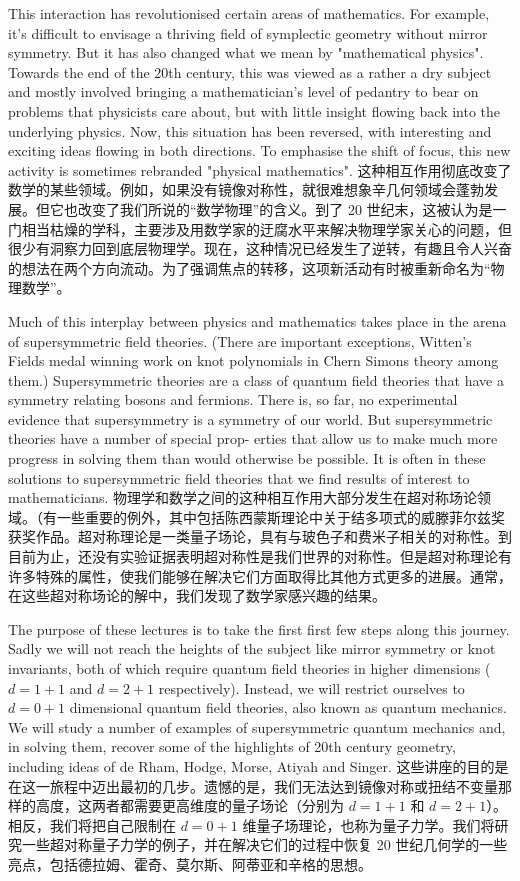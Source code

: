 \documentclass{article}
\begin{document}
This interaction has revolutionised certain areas of mathematics. For example, it's difficult to envisage a thriving field of symplectic geometry without mirror symmetry. But it has also changed what we mean by "mathematical physics". Towards the end of the 20th century, this was viewed as a rather a dry subject and mostly involved bringing a mathematician's level of pedantry to bear on problems that physicists care about, but with little insight flowing back into the underlying physics. Now, this situation has been reversed, with interesting and exciting ideas flowing in both directions. To emphasise the shift of focus, this new activity is sometimes rebranded "physical mathematics".
这种相互作用彻底改变了数学的某些领域。例如，如果没有镜像对称性，就很难想象辛几何领域会蓬勃发展。但它也改变了我们所说的“数学物理”的含义。到了 20 世纪末，这被认为是一门相当枯燥的学科，主要涉及用数学家的迂腐水平来解决物理学家关心的问题，但很少有洞察力回到底层物理学。现在，这种情况已经发生了逆转，有趣且令人兴奋的想法在两个方向流动。为了强调焦点的转移，这项新活动有时被重新命名为“物理数学”。

Much of this interplay between physics and mathematics takes place in the arena of supersymmetric field theories. (There are important exceptions, Witten's Fields medal winning work on knot polynomials in Chern Simons theory among them.) Supersymmetric theories are a class of quantum field theories that have a symmetry relating bosons and fermions. There is, so far, no experimental evidence that supersymmetry is a symmetry of our world. But supersymmetric theories have a number of special prop- erties that allow us to make much more progress in solving them than would otherwise be possible. It is often in these solutions to supersymmetric field theories that we find results of interest to mathematicians.
物理学和数学之间的这种相互作用大部分发生在超对称场论领域。（有一些重要的例外，其中包括陈西蒙斯理论中关于结多项式的威滕菲尔兹奖获奖作品。超对称理论是一类量子场论，具有与玻色子和费米子相关的对称性。到目前为止，还没有实验证据表明超对称性是我们世界的对称性。但是超对称理论有许多特殊的属性，使我们能够在解决它们方面取得比其他方式更多的进展。通常，在这些超对称场论的解中，我们发现了数学家感兴趣的结果。

The purpose of these lectures is to take the first first few steps along this journey. Sadly we will not reach the heights of the subject like mirror symmetry or knot invariants, both of which require quantum field theories in higher dimensions ($d = 1 + 1$ and $d = 2 + 1$ respectively). Instead, we will restrict ourselves to $d = 0 + 1$ dimensional quantum field theories, also known as quantum mechanics. We will study a number of examples of supersymmetric quantum mechanics and, in solving them, recover some of the highlights of 20th century geometry, including ideas of de Rham, Hodge, Morse, Atiyah and Singer.
这些讲座的目的是在这一旅程中迈出最初的几步。遗憾的是，我们无法达到镜像对称或扭结不变量那样的高度，这两者都需要更高维度的量子场论（分别为 $d = 1 + 1$ 和 $d = 2 + 1$）。相反，我们将把自己限制在 $d = 0 + 1$ 维量子场理论，也称为量子力学。我们将研究一些超对称量子力学的例子，并在解决它们的过程中恢复 20 世纪几何学的一些亮点，包括德拉姆、霍奇、莫尔斯、阿蒂亚和辛格的思想。
\end{document}
